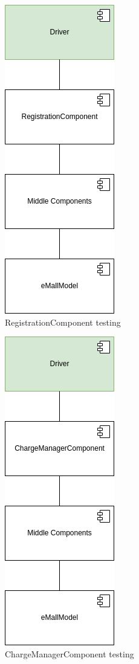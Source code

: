 \begin{figure}[H]
    \centering
    \includegraphics[keepaspectratio]{Testing/emall/registration.png}
    \caption{RegistrationComponent testing}
\end{figure}
\begin{figure}[H]
    \centering
    \includegraphics[keepaspectratio]{Testing/emall/chargemanager.png}
    \caption{ChargeManagerComponent testing}
\end{figure}
